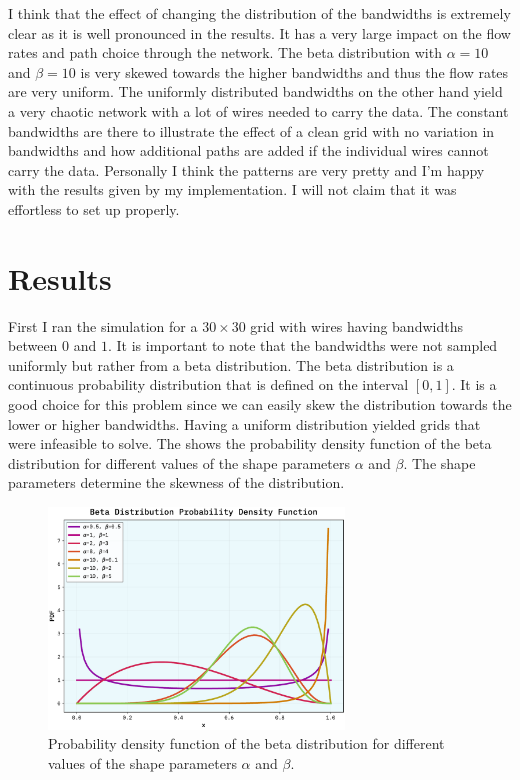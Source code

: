 \documentclass[10pt, titlepage, a4paper]{article}
\begin{document}
I think that the effect of changing the distribution of the bandwidths is extremely clear as it is well pronounced in the
results. It has a very large impact on the flow rates and path choice through the network. The beta distribution with
$\alpha = 10$ and $\beta = 10$ is very skewed towards the higher bandwidths and thus the flow rates are very uniform. The uniformly 
distributed bandwidths on the other hand yield a very chaotic network with a lot of wires needed to carry the data. The constant
bandwidths are there to illustrate the effect of a clean grid with no variation in bandwidths and how additional paths are added if the 
individual wires cannot carry the data. Personally I think the patterns are very pretty and I'm happy with the results given by my implementation.
I will not claim that it was effortless to set up properly. \\


\section{Results}
First I ran the simulation for a $30\times 30$ grid with wires having bandwidths between $0$ and $1$. It is important to note 
that the bandwidths were not sampled uniformly but rather from a beta distribution. The beta distribution is a 
continuous probability distribution that is defined on the interval $[0, 1]$. It is a good choice for this problem
since we can easily skew the distribution towards the lower or higher bandwidths. Having a uniform distribution yielded 
grids that were infeasible to solve. The \textcolor{red}{} shows the probability density function
of the beta distribution for different values of the shape parameters $\alpha$ and $\beta$. The shape parameters determine
the skewness of the distribution. 

\begin{figure}[H]
    \centering
    \includegraphics[width=0.7\textwidth]{../Images/beta_dist.pdf}
    \caption{Probability density function of the beta distribution for different values of the shape parameters $\alpha$ and $\beta$.}
    \label{fig:beta_dist}
\end{figure}
\end{document}
